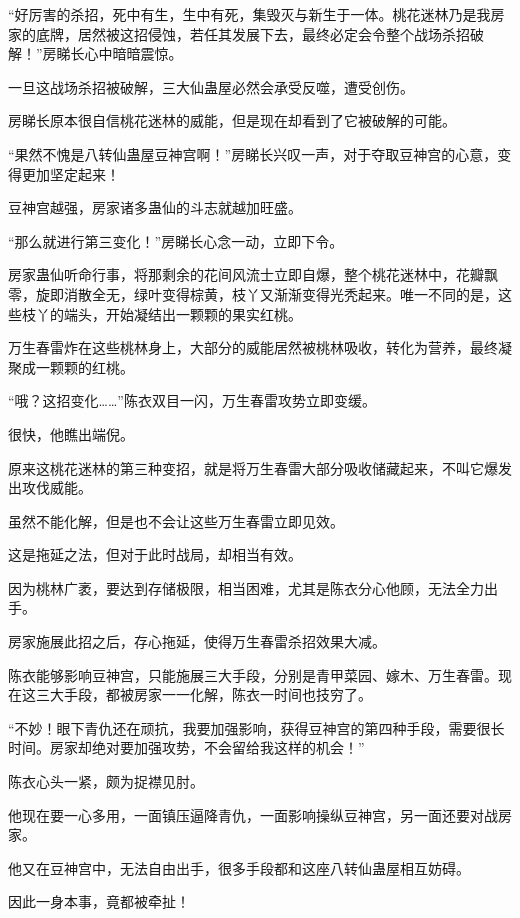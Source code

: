 
\begin{this_body}

“好厉害的杀招，死中有生，生中有死，集毁灭与新生于一体。桃花迷林乃是我房家的底牌，居然被这招侵蚀，若任其发展下去，最终必定会令整个战场杀招破解！”房睇长心中暗暗震惊。

一旦这战场杀招被破解，三大仙蛊屋必然会承受反噬，遭受创伤。

房睇长原本很自信桃花迷林的威能，但是现在却看到了它被破解的可能。

“果然不愧是八转仙蛊屋豆神宫啊！”房睇长兴叹一声，对于夺取豆神宫的心意，变得更加坚定起来！

豆神宫越强，房家诸多蛊仙的斗志就越加旺盛。

“那么就进行第三变化！”房睇长心念一动，立即下令。

房家蛊仙听命行事，将那剩余的花间风流士立即自爆，整个桃花迷林中，花瓣飘零，旋即消散全无，绿叶变得棕黄，枝丫又渐渐变得光秃起来。唯一不同的是，这些枝丫的端头，开始凝结出一颗颗的果实红桃。

万生春雷炸在这些桃林身上，大部分的威能居然被桃林吸收，转化为营养，最终凝聚成一颗颗的红桃。

“哦？这招变化……”陈衣双目一闪，万生春雷攻势立即变缓。

很快，他瞧出端倪。

原来这桃花迷林的第三种变招，就是将万生春雷大部分吸收储藏起来，不叫它爆发出攻伐威能。

虽然不能化解，但是也不会让这些万生春雷立即见效。

这是拖延之法，但对于此时战局，却相当有效。

因为桃林广袤，要达到存储极限，相当困难，尤其是陈衣分心他顾，无法全力出手。

房家施展此招之后，存心拖延，使得万生春雷杀招效果大减。

陈衣能够影响豆神宫，只能施展三大手段，分别是青甲菜园、嫁木、万生春雷。现在这三大手段，都被房家一一化解，陈衣一时间也技穷了。

“不妙！眼下青仇还在顽抗，我要加强影响，获得豆神宫的第四种手段，需要很长时间。房家却绝对要加强攻势，不会留给我这样的机会！”

陈衣心头一紧，颇为捉襟见肘。

他现在要一心多用，一面镇压逼降青仇，一面影响操纵豆神宫，另一面还要对战房家。

他又在豆神宫中，无法自由出手，很多手段都和这座八转仙蛊屋相互妨碍。

因此一身本事，竟都被牵扯！


\end{this_body}
